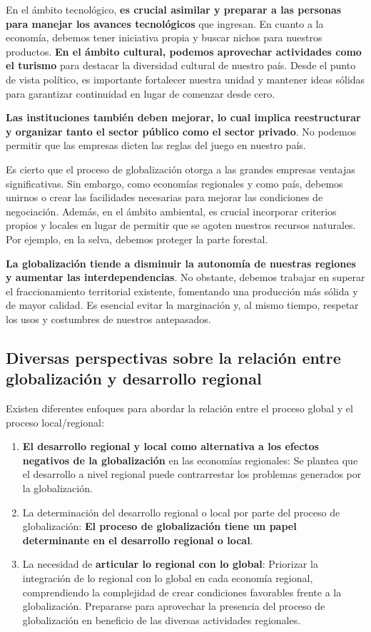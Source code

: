 \documentclass[
  jou,
  floatsintext,
  longtable,
  a4paper,
  nolmodern,
  notxfonts,
  notimes,
  12pt,
  colorlinks=true,linkcolor=blue,citecolor=blue,urlcolor=blue]{apa7}
\begin{document}
En el ámbito tecnológico, \textbf{es crucial asimilar y preparar a las
personas para manejar los avances tecnológicos} que ingresan. En cuanto
a la economía, debemos tener iniciativa propia y buscar nichos para
nuestros productos. \textbf{En el ámbito cultural, podemos aprovechar
actividades como el turismo} para destacar la diversidad cultural de
nuestro país. Desde el punto de vista político, es importante fortalecer
nuestra unidad y mantener ideas sólidas para garantizar continuidad en
lugar de comenzar desde cero.

\textbf{Las instituciones también deben mejorar, lo cual implica
reestructurar y organizar tanto el sector público como el sector
privado}. No podemos permitir que las empresas dicten las reglas del
juego en nuestro país.

Es cierto que el proceso de globalización otorga a las grandes empresas
ventajas significativas. Sin embargo, como economías regionales y como
país, debemos unirnos o crear las facilidades necesarias para mejorar
las condiciones de negociación. Además, en el ámbito ambiental, es
crucial incorporar criterios propios y locales en lugar de permitir que
se agoten nuestros recursos naturales. Por ejemplo, en la selva, debemos
proteger la parte forestal.

\textbf{La globalización tiende a disminuir la autonomía de nuestras
regiones y aumentar las interdependencias}. No obstante, debemos
trabajar en superar el fraccionamiento territorial existente, fomentando
una producción más sólida y de mayor calidad. Es esencial evitar la
marginación y, al mismo tiempo, respetar los usos y costumbres de
nuestros antepasados.

\subsection{Diversas perspectivas sobre la relación entre globalización
y desarrollo
regional}\label{diversas-perspectivas-sobre-la-relaciuxf3n-entre-globalizaciuxf3n-y-desarrollo-regional}

Existen diferentes enfoques para abordar la relación entre el proceso
global y el proceso local/regional:

\begin{enumerate}
\def\labelenumi{\arabic{enumi}.}
\item
  \textbf{El desarrollo regional y local como alternativa a los efectos
  negativos de la globalización} en las economías regionales: Se plantea
  que el desarrollo a nivel regional puede contrarrestar los problemas
  generados por la globalización.
\item
  La determinación del desarrollo regional o local por parte del proceso
  de globalización: \textbf{El proceso de globalización tiene un papel
  determinante en el desarrollo regional o local}.
\item
  La necesidad de \textbf{articular lo regional con lo global}:
  Priorizar la integración de lo regional con lo global en cada economía
  regional, comprendiendo la complejidad de crear condiciones favorables
  frente a la globalización. Prepararse para aprovechar la presencia del
  proceso de globalización en beneficio de las diversas actividades
  regionales.
\end{enumerate}
\end{document}
